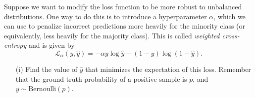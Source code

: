 \documentclass[11pt]{article}
\begin{document}
\begin{subparts}

        \newpage


        \subpart Suppose we want to modify the loss function to be more robust to unbalanced distributions. One way to do this is to introduce a hyperparameter $\alpha$, which we can use to penalize incorrect predictions more heavily for the minority class (or equivalently, less heavily for the majority class). This is called \emph{weighted cross-entropy} and is given by
        $$
        \mathcal{L}_\alpha(y, \hat{y}) = - \alpha y \log \hat{y} - (1 - y) \log (1 - \hat{y}).
        $$
        \begin{enumerate}
            \item[(i)] Find the value of $\hat{y}$ that minimizes the expectation of this loss. Remember that the ground-truth probability of a positive sample is $p$, and $y \sim \text{Bernoulli}(p)$.
            

\end{enumerate}
\end{subparts}
\end{document}
